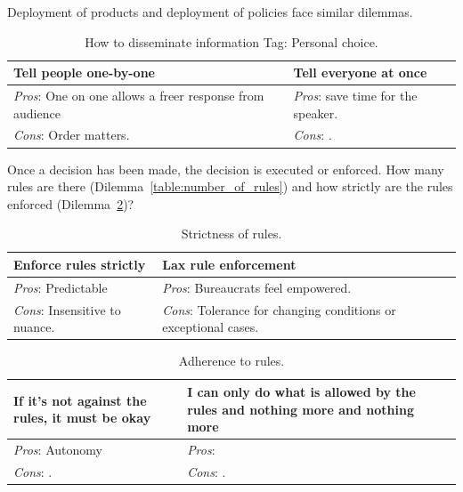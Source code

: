 Deployment of products and deployment of policies face similar dilemmas. 

\begin{center}
\begin{table}[ht]
\begin{tabular}{ | m{\dilemmatablewidth}| m{\dilemmatablewidth} | } 
  \hline
  \textbf{Tell people one-by-one} & 
  \textbf{Tell everyone at once} \\ 
  \hline
  \textit{Pros}: One on one allows a freer response from audience &
  \textit{Pros}: save time for the speaker. \\
  \hline
  \textit{Cons}: Order matters. & 
  \textit{Cons}: . \\  
  \hline
\end{tabular}
\caption{How to disseminate information
{\tiny Tag: Personal choice.}
}
\label{table:disseminate_one-by-one}
\end{table}
\end{center}

Once a decision has been made, the decision is executed or enforced. How many rules are there (Dilemma~\ref{table:number_of_rules}) and
how strictly are the rules enforced (Dilemma~\ref{table:rule_strictness})?

\begin{center}
\begin{table}[ht]
\begin{tabular}{ | m{\dilemmatablewidth}| m{\dilemmatablewidth} | } 
  \hline
  \textbf{Enforce rules strictly} & 
  \textbf{Lax rule enforcement} \\ 
  \hline
  \textit{Pros}: Predictable &
  \textit{Pros}: Bureaucrats feel empowered. \\
  \hline
  \textit{Cons}: Insensitive to nuance. & 
  \textit{Cons}: Tolerance for changing conditions or exceptional cases.  \\  
  \hline
\end{tabular}
\caption{Strictness of rules.
}
\label{table:rule_strictness}
\end{table}
\end{center}

\begin{center}
\begin{table}[ht]
\begin{tabular}{ | m{\dilemmatablewidth}| m{\dilemmatablewidth} | } 
  \hline
  \textbf{If it's not against the rules, it must be okay} & 
  \textbf{I can only do what is allowed by the rules and nothing more and nothing more} \\ 
  \hline
  \textit{Pros}: Autonomy &
  \textit{Pros}:  \\
  \hline
  \textit{Cons}: . & 
  \textit{Cons}: .  \\  
  \hline
\end{tabular}
\caption{Adherence to rules.
}
\label{table:rule_adherence}
\end{table}
\end{center}





